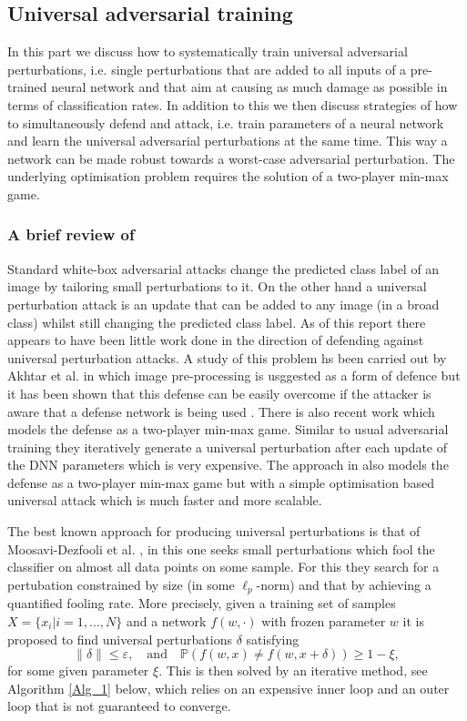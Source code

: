\subsection{Universal adversarial training}
In this part we discuss how to systematically train universal adversarial perturbations, i.e. single perturbations that are added to all inputs of a pre-trained neural network and that aim at causing as much damage as possible in terms of classification rates. In addition to this we then discuss strategies of how to simultaneously defend and attack, i.e. train parameters of a neural network and learn the universal adversarial perturbations at the same time. This way a network can be made robust towards a worst-case adversarial perturbation. The underlying optimisation problem requires the solution of a two-player min-max game.

\subsubsection{A brief review of \cite{shafahi_universal_2018}}

Standard white-box adversarial attacks change the predicted class label of an image by tailoring small perturbations to it. On the other hand a universal perturbation attack is an update that can be added to any image (in a broad class) whilst still changing the predicted class label. As of this report there appears to have been little work done in the direction of defending against universal perturbation attacks. A study of this problem hs been carried out by Akhtar et al. \cite{akhtar_defense_2018} in which image pre-processing is usggested as a form of defence but it has been shown that this defense can be easily overcome if the attacker is aware that a defense network is being used \cite{carlini_adversarial_2017}. There is also recent work \cite{perolat_playing_2018} which models the defense as a two-player min-max game. Similar to usual adversarial training they iteratively generate a universal perturbation after each update of the DNN parameters which is very expensive. The approach in \cite{shafahi_universal_2018} also models the defense as a two-player min-max game but with a simple optimisation based universal attack which is much faster and more scalable.

The best known approach for producing universal perturbations is that of Moosavi-Dezfooli et al. \cite{moosavi-dezfooli_universal_2017}, in this one seeks small perturbations which fool the classifier on almost all data points on some sample. For this they search for a pertubation constrained by size (in some $\ell_p$-norm) and that by achieving a quantified fooling rate.  More precisely, given a training set of samples $X=\{ x_i | i=1,...,N \}$ and a network $f(w,\cdot)$ with frozen parameter $w$ it is proposed to find universal perturbations $\delta$ satisfying 
$$\| \delta \| \leq \varepsilon, \quad \text{and} \quad \mathbb{P}(f(w, x) \neq f(w, x + \delta)) \geq 1-\xi,$$
for some given parameter $\xi$. This is then solved by an iterative method, see Algorithm \ref{Alg_1} below, which relies on an expensive inner loop and an outer loop that is not guaranteed to converge.  

